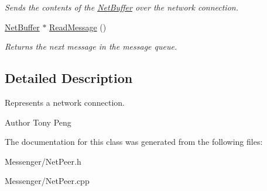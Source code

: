 \begin{DoxyCompactItemize}
\begin{DoxyCompactList}\small\item\em Sends the contents of the \hyperlink{class_rhesus_1_1_messenger_1_1_net_buffer}{Net\-Buffer} over the network connection. \end{DoxyCompactList}\item 
\hypertarget{class_rhesus_1_1_messenger_1_1_net_peer_a8f31d58519d76063596f3a7aafde0ba1}{\hyperlink{class_rhesus_1_1_messenger_1_1_net_buffer}{Net\-Buffer} $\ast$ \hyperlink{class_rhesus_1_1_messenger_1_1_net_peer_a8f31d58519d76063596f3a7aafde0ba1}{Read\-Message} ()}\label{class_rhesus_1_1_messenger_1_1_net_peer_a8f31d58519d76063596f3a7aafde0ba1}

\begin{DoxyCompactList}\small\item\em Returns the next message in the message queue. \end{DoxyCompactList}\end{DoxyCompactItemize}


\subsection{Detailed Description}
Represents a network connection. 

\begin{DoxyAuthor}{Author}
Tony Peng 
\end{DoxyAuthor}


The documentation for this class was generated from the following files\-:\begin{DoxyCompactItemize}
\item 
Messenger/Net\-Peer.\-h\item 
Messenger/Net\-Peer.\-cpp\end{DoxyCompactItemize}
